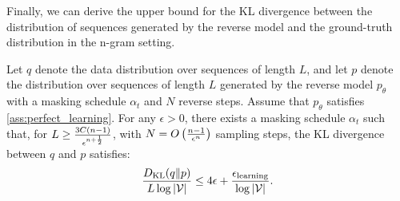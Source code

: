 Finally, we can derive the upper bound for the KL divergence between the distribution of sequences generated by the
reverse model and the ground-truth distribution in the n-gram setting.

\begin{lemma}
\label{lemma:effi_kl_bound}
    Let $q$ denote the data distribution over sequences of length $L$, and let $p$ denote the distribution over sequences of length $L$ generated by the reverse model $p_\theta$ with a masking schedule $\alpha_t$ and $N$ reverse steps. Assume that $p_\theta$ satisfies \cref{ass:perfect_learning}. For any $\epsilon > 0$, there exists a masking schedule $\alpha_t$ such that, for $L\geq \frac{3C(n-1)}{{\epsilon}^{n+\frac{1}{2}}}$, with $N = O\left(\frac{n-1}{{\epsilon}^{n}}\right)$ sampling steps, the KL divergence between $q$ and $p$ satisfies:
    $$\frac{D_{\mathrm{KL}}(q\|p)}{L\log|{\mathcal{V}}|} \leq 4{\epsilon} +\frac{{\epsilon}_\mathrm{learning}}{\log|{\mathcal{V}}|}.$$
\end{lemma}

